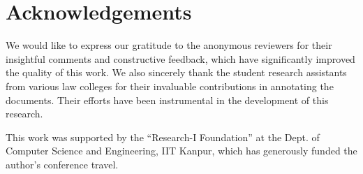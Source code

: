 \section*{Acknowledgements}

We would like to express our gratitude to the anonymous reviewers for their insightful comments and constructive feedback, which have significantly improved the quality of this work. We also sincerely thank the student research assistants from various law colleges for their invaluable contributions in annotating the documents. Their efforts have been instrumental in the development of this research.  

This work was supported by the ``Research-I Foundation'' at the Dept. of Computer Science and Engineering, IIT Kanpur, which has generously funded the author's conference travel.
